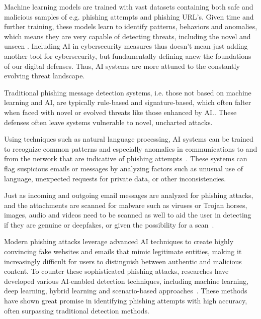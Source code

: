Machine learning models are trained with vast datasets containing both safe and malicious samples of e.g. phishing attempts and phishing URL's. Given time and further training, these models learn to identify patterns, behaviors and anomalies, which means they are very capable of detecting threats, including the novel and unseen \citep{fakhouri_AI_Driven_Solutions_SE_Attacks_2024}. Including AI in cybersecurity measures thus doesn't mean just adding another tool for cybersecurity, but fundamentally defining anew the foundations of our digital defenses. Thus, AI systems are more attuned to the constantly evolving threat landscape.

Traditional phishing message detection systems, i.e. those not based on machine learning and AI, are typically rule-based and signature-based, which often falter when faced with novel or evolved threats like those enhanced by AI.\citep{fakhouri_AI_Driven_Solutions_SE_Attacks_2024}. These defenses often leave systems vulnerable to novel, uncharted attacks.

Using techniques such as natural language processing, AI systems can be trained to recognize common patterns and especially anomalies in communications to and from the network that are indicative of phishing attempts~\citep{basit_Comprehensive_Survey_AI_Phishing_Detection_2021}. These systems can flag suspicious emails or messages by analyzing factors such as unusual use of language, unexpected requests for private data, or other inconsistencies.

Just as incoming and outgoing email messages are analyzed for phishing attacks, and the attachments are scanned for malware such as viruses or Trojan horses, images, audio and videos need to be scanned as well to aid the user in detecting if they are genuine or deepfakes, or given the possibility for a scan~\citep{mirsky_Creation_Detection_Deepfakes_2021}.


Modern phishing attacks leverage advanced AI techniques to create highly convincing fake websites and emails that mimic legitimate entities, making it increasingly difficult for users to distinguish between authentic and malicious content. To counter these sophisticated phishing attacks, researches have developed various AI-enabled detection techniques, including machine learning, deep learning, hybrid learning and scenario-based approaches~\citep{basit_Comprehensive_Survey_AI_Phishing_Detection_2021}. These methods have shown great promise in identifying phishing attempts with high accuracy, often surpassing traditional detection methods.

